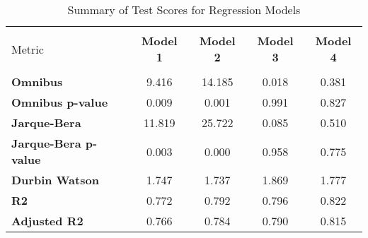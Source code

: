 
    \begin{table}
        \centering
        \caption{Summary of Test Scores for Regression Models}
        \vspace{10pt}
        \label{tab:test_scores}
        \begin{tabular}{lcccc}
        \hline
        \hline \\[-1.8ex]
    Metric & \textbf{Model 1} & \textbf{Model 2} & \textbf{Model 3} & \textbf{Model 4} \\
\hline \\[-1.8ex] 
\textbf{Omnibus} & 9.416 & 14.185 & 0.018 & 0.381 \\
\textbf{Omnibus p-value} & 0.009 & 0.001 & 0.991 & 0.827 \\
\textbf{Jarque-Bera} & 11.819 & 25.722 & 0.085 & 0.510 \\
\textbf{Jarque-Bera p-value} & 0.003 & 0.000 & 0.958 & 0.775 \\
\textbf{Durbin Watson} & 1.747 & 1.737 & 1.869 & 1.777 \\
\textbf{R2} & 0.772 & 0.792 & 0.796 & 0.822 \\
\textbf{Adjusted R2} & 0.766 & 0.784 & 0.790 & 0.815 \\

        \hline
        \hline
        \end{tabular}
    \end{table}
    